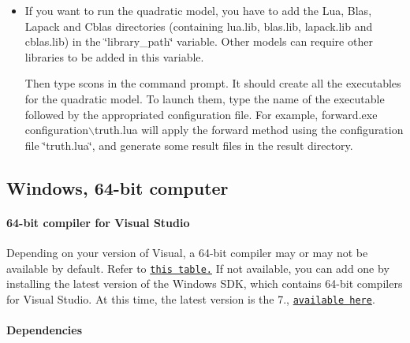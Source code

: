 \documentclass{tufte-book}
\begin{document}
\begin{itemize}
\item \-If you want to run the quadratic model, you have to add the \-Lua, \-Blas, \-Lapack and \-Cblas directories (containing lua.\-lib, blas.\-lib, lapack.\-lib and cblas.\-lib) in the \char`\"{}library\-\_\-path\char`\"{} variable. \-Other models can require other libraries to be added in this variable.

\-Then type {\ttfamily scons} in the command prompt. \-It should create all the executables for the quadratic model. \-To launch them, type the name of the executable followed by the appropriated configuration file. \-For example, {\ttfamily forward.\-exe configuration$\backslash$truth.\-lua} will apply the forward method using the configuration file \char`\"{}truth.\-lua\char`\"{}, and generate some result files in the {\ttfamily result} directory.
\end{itemize}

\hypertarget{installation_windows64}{}\subsection{\-Windows, 64-\/bit computer}\label{installation_windows64}

\hypertarget{installation_compiler}{}\paragraph{64-\/bit compiler for Visual Studio}\label{installation_compiler}

\-Depending on your version of \-Visual, a 64-\/bit compiler may or may not be available by default. \-Refer to \href{http://msdn.microsoft.com/en-us/library/hs24szh9.aspx}{\tt this table.} \-If not available, you can add one by installing the latest version of the \-Windows \-S\-D\-K, which contains 64-\/bit compilers for \-Visual \-Studio. \-At this time, the latest version is the 7., \href{http://www.microsoft.com/downloads/en/details.aspx?FamilyID=6b6c21d2-2006-4afa-9702-529fa782d63b&displaylang=en}{\tt available here}.

\hypertarget{installation_windows64_dependencies}{}\paragraph{\-Dependencies}\label{installation_windows64_dependencies}
\end{document}
